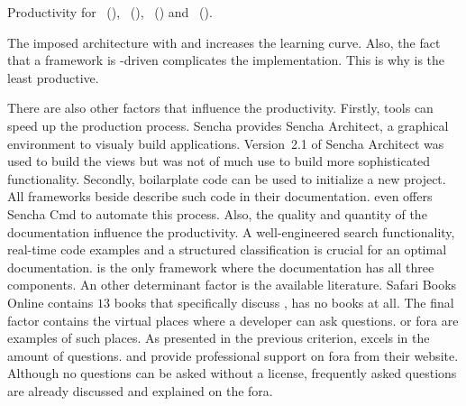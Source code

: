 \documentclass[a4paper]{artikel3}
\begin{document}
\begin{table}[t]
\centering
{}
\caption{Productivity for \st{}~(\sta), \kendo{}~(\kendoa), \jqm{}~(\jqma) and \lungo{}~(\lungoa).}
\label{tabel:evaluatie-productiviteit}
\end{table}


The imposed architecture with \sta{} and \kendoa{} increases the learning curve.
Also, the fact that a framework is \js-driven complicates the implementation.
This is why \sta{} is the least productive.

There are also other factors that influence the productivity.
Firstly,  tools can speed up the production process.
Sencha provides Sencha Architect,  a graphical environment to visualy build applications.
Version~2.1 of Sencha Architect was used to build the views but was not of much use to build more sophisticated functionality.
Secondly,  boilarplate code can be used to initialize a new project.
All frameworks beside \lungo{} describe such code in their documentation.
\sta{} even offers Sencha Cmd to automate this process.
Also, the quality and quantity of the documentation influence the productivity.
A well-engineered search functionality,  real-time code examples and a structured classification is crucial for an optimal documentation.
\kendoa{} is the only framework where the documentation has all three components.  
An other determinant factor is the available literature.
Safari Books Online contains $13$ books that specifically discuss \jqma{},  \lungo{} has no books at all.
The final factor contains the virtual places where a developer can ask questions.
\so{} or fora are examples of such places.
As presented in the previous criterion,  \jqma{} excels in the amount of \so{} questions.
\sta{} and \kendoa{} provide professional support on fora from their website.
Although no questions can be asked without a license,  frequently asked questions are already discussed and explained on the fora.
\end{document}
